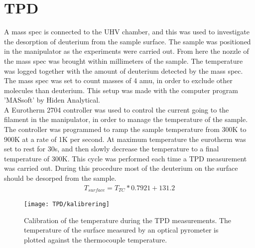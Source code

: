 \section{TPD}

A mass spec is connected to the UHV chamber, and this was used to investigate the desorption of deuterium from the sample surface. The sample was positioned in the manipulator as the experiments were carried out. From here the nozzle of the mass spec was brought within millimeters of the sample. The temperature was logged together with the amount of deuterium detected by the mass spec. The mass spec was set to count masses of 4 amu, in order to exclude other molecules than deuterium. This setup was made with the computer program 'MASsoft' by Hiden Analytical.\\
A Eurotherm 2704 controller was used to control the current going to the filament in the manipulator, in order to manage the temperature of the sample. The controller was programmed to ramp the sample temperature from 300K to 900K at a rate of 1K per second. At maximum temperature the eurotherm was set to rest for 30s, and then slowly decrease the temperature to a final temperature of 300K. This cycle was performed each time a TPD measurement was carried out. During this procedure most of the deuterium on the surface should be desorped from the sample.\\
\begin{align*}
  T_{surface} = T_{TC} * 0.7921 + 131.2
\end{align*}
\begin{figure}
  \centering
  \texttt{[image: TPD/kalibrering]}
  \caption{Calibration of the temperature during the TPD measurements. The temperature of the surface measured by an optical pyrometer is plotted against the thermocouple temperature.}
  \label{TPDcalibration}
\end{figure}
